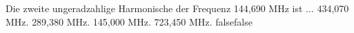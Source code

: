     {Die zweite ungeradzahlige Harmonische der Frequenz 144,690 MHz ist ...}
    {434,070 MHz.}
    {289,380 MHz.}
    {145,000 MHz.}
    {723,450 MHz.}
    {false}{false}